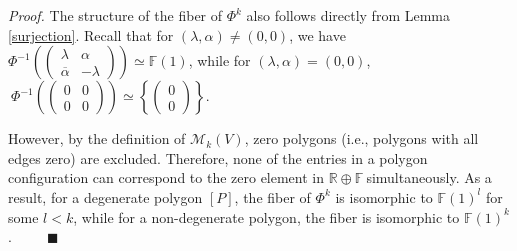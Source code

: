 \documentclass[10pt,a4paper]{amsart}
\newenvironment{proof}[1][Proof]{\noindent\textit{#1.} }{}
\begin{document}
\begin{proof}
The structure of the fiber of $\Phi^{k}$ also follows directly from Lemma
\ref{surjection}. Recall that for $(\lambda,\alpha)\neq(0,0)$, we have
$\Phi^{-1}\left(
\begin{pmatrix}
\lambda & \alpha\\
\overline{\alpha} & -\lambda
\end{pmatrix}
\right)  \simeq\mathbb{F}(1)$, while for $(\lambda,\alpha)=(0,0)$,$\ \Phi
^{-1}\left(
\begin{pmatrix}
0 & 0\\
0 & 0
\end{pmatrix}
\right)  \simeq\left\{
\begin{pmatrix}
0\\
0
\end{pmatrix}
\right\}  $.

However, by the definition of $\mathcal{M}_{k}(V)$, zero polygons (i.e.,
polygons with all edges zero) are excluded. Therefore, none of the entries in
a polygon configuration can correspond to the zero element in $\mathbb{R}%
\oplus\mathbb{F\ }$simultaneously. As a result, for a degenerate polygon
$[P]$, the fiber of $\Phi^{k}$ is isomorphic to $\mathbb{F}(1)^{l}$ for some
$l<k$, while for a non-degenerate polygon, the fiber is isomorphic to
$\mathbb{F}(1)^{k}$.\ \ \ \ \ $\blacksquare$
\end{proof}
\end{document}
